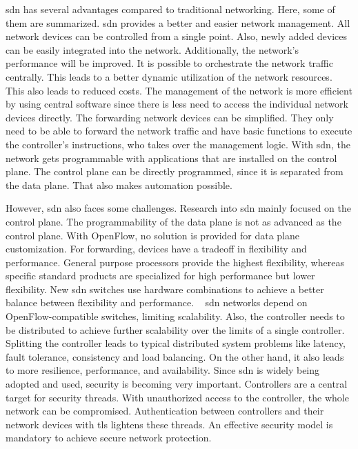 \documentclass[conference]{IEEEtran}
\begin{document}
	\acf{sdn} has several advantages compared to traditional networking. Here, some of them are summarized. \ac{sdn} provides a better and easier network management. All network devices can be controlled from a single point. Also, newly added devices can be easily integrated into the network. \cite{Jefia2018-pj} Additionally, the network's performance will be improved. It is possible to orchestrate the network traffic centrally. This leads to a better dynamic utilization of the network resources. This also leads to reduced costs. The management of the network is more efficient by using central software since there is less need to access the individual network devices directly. \cite{Jefia2018-pj}
	The forwarding network devices can be simplified. They only need to be able to forward the network traffic and have basic functions to execute the controller's instructions, who takes over the management logic. \cite{Hussain2022-tc} With \ac{sdn}, the network gets programmable with applications that are installed on the control plane. The control plane can be directly programmed, since it is separated from the data plane. That also makes automation possible. \cite{Hussain2022-tc}

	However, \ac{sdn} also faces some challenges. Research into \ac{sdn} mainly focused on the control plane. The programmability of the data plane is not as advanced as the control plane. With OpenFlow, no solution is provided for data plane customization. \cite{MASOUDI20161}
	For forwarding, devices have a tradeoff in flexibility and performance. General purpose processors provide the highest flexibility, whereas specific standard products are specialized for high performance but lower flexibility. \cite{Jefia2018-pj}New \ac{sdn} switches use hardware combinations to achieve a better balance between flexibility and performance.  \cite{MASOUDI20161} \ac{sdn} networks depend on OpenFlow-compatible switches, limiting scalability. Also, the controller needs to be distributed to achieve further scalability over the limits of a single controller. Splitting the controller leads to typical distributed system problems like latency, fault tolerance, consistency and load balancing. On the other hand, it also leads to more resilience, performance, and availability. \cite{MASOUDI20161} 
	Since \ac{sdn} is widely being adopted and used, security is becoming very important. Controllers are a central target for security threads. With unauthorized access to the controller, the whole network can be compromised. Authentication between controllers and their network devices with \ac{tls} lightens these threads. An effective security model is mandatory to achieve secure network protection. \cite{Jefia2018-pj}
\end{document}
